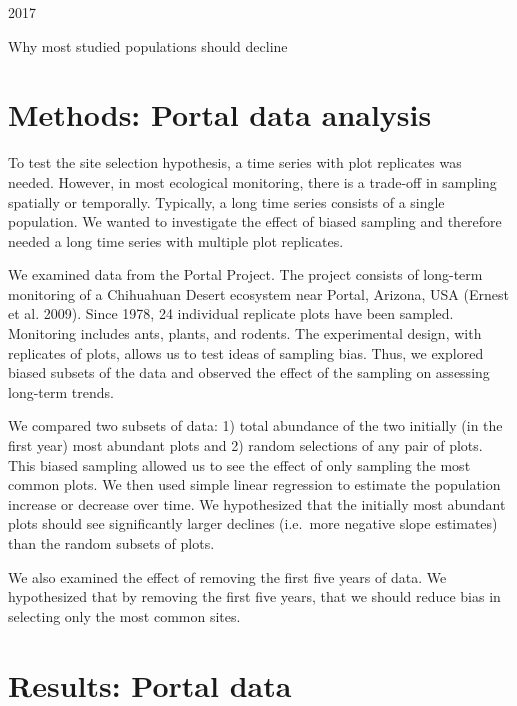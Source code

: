 \documentclass[]{article}
\title{}
\author{}
\date{}
\begin{document}
2017 \vspace{4cm}

\begin{center}
{\Large Why most studied populations should decline}

\vspace{4cm}

\end{center}

\section{Methods: Portal data analysis}

To test the site selection hypothesis, a time series with plot
replicates was needed. However, in most ecological monitoring, there is
a trade-off in sampling spatially or temporally. Typically, a long time
series consists of a single population. We wanted to investigate the
effect of biased sampling and therefore needed a long time series with
multiple plot replicates.

We examined data from the Portal Project. The project consists of
long-term monitoring of a Chihuahuan Desert ecosystem near Portal,
Arizona, USA (Ernest et al. 2009). Since 1978, 24 individual replicate
plots have been sampled. Monitoring includes ants, plants, and rodents.
The experimental design, with replicates of plots, allows us to test
ideas of sampling bias. Thus, we explored biased subsets of the data and
observed the effect of the sampling on assessing long-term trends.

We compared two subsets of data: 1) total abundance of the two initially
(in the first year) most abundant plots and 2) random selections of any
pair of plots. This biased sampling allowed us to see the effect of only
sampling the most common plots. We then used simple linear regression to
estimate the population increase or decrease over time. We hypothesized
that the initially most abundant plots should see significantly larger
declines (i.e.~more negative slope estimates) than the random subsets of
plots.

We also examined the effect of removing the first five years of data. We
hypothesized that by removing the first five years, that we should
reduce bias in selecting only the most common sites.

\section{Results: Portal data}
\end{document}
